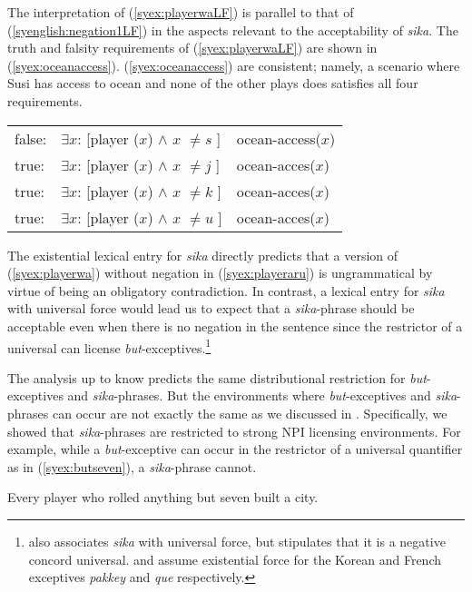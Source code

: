 \documentclass[output=paper]{langscibook}
\begin{document}
The interpretation of (\ref{syex:playerwaLF}) is parallel to that of (\ref{syenglish:negation1LF}) in the aspects relevant to the acceptability of \emph{sika}.
The truth and falsity requirements of (\ref{syex:playerwaLF}) are shown in (\ref{syex:oceanaccess}).
(\ref{syex:oceanaccess}) are consistent; namely, a scenario where Susi has  access to ocean and none of the other plays does satisfies all four requirements.

\ea \label{syex:oceanaccess}
    \begin{tabular}[t]{@{}l@{~}l@{~\&~}l@{}}
    false: & $\exists x$: [player ($x$) $\land$ $x$ $\neq s$ ] & ocean-access($x$)\\
    true:  & $\exists x$: [player ($x$) $\land$ $x$ $\neq j$ ] & ocean-acces($x$)\\
    true:  & $\exists x$: [player ($x$) $\land$ $x$ $\neq k$ ] & ocean-acces($x$)\\
    true:  & $\exists x$: [player ($x$) $\land$ $x$ $\neq u$ ] & ocean-acces($x$)\\
    \end{tabular}
\z


The existential lexical entry for \emph{sika} directly predicts that a version of (\ref{syex:playerwa}) without negation in (\ref{syex:playeraru}) is ungrammatical by virtue of being an obligatory contradiction. In contrast, a lexical entry for \emph{sika} with universal force \citep{alonso-ovalle04a,kawahara08a,yoshimura06a} would lead us to expect that a \emph{sika}-phrase should be acceptable even when there is no negation in the sentence since the restrictor of a universal can license \emph{but}-exceptives.\footnote{\citet{shimoyama11} also associates \emph{sika} with universal force, but stipulates that it is a negative concord universal.  \citet{sells01a} and \citet{fintel07a} assume existential force for the Korean and French exceptives \emph{pakkey} and \emph{que} respectively.} 

The analysis up to know predicts the same distributional restriction for \emph{but}-exceptives and \emph{sika}-phrases.
But the environments where \emph{but}-exceptives and \emph{sika}-phrases can occur are not exactly the same as we discussed in .
Specifically, we showed that \emph{sika}-phrases are restricted to strong NPI licensing environments. 
For example,  while a \emph{but}-exceptive can occur in the restrictor of a universal quantifier as in (\ref{syex:butseven}), a \emph{sika}-phrase cannot.

\ea \label{syex:butseven}
Every player who rolled anything but seven built a city.\z
\end{document}
